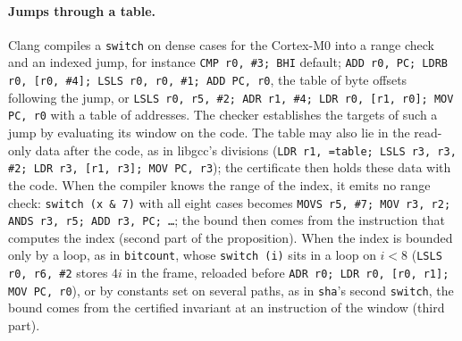 \documentclass[oneside,english]{amsart}
\numberwithin{equation}{section}
\theoremstyle{plain}
\theoremstyle{definition}
\theoremstyle{plain}
\theoremstyle{plain}
\theoremstyle{remark}
\begin{document}
\paragraph{Jumps through a table.} Clang compiles a \texttt{switch} on dense cases for the Cortex-M0 into a range check and an indexed jump, for instance \texttt{CMP r0, \#3; BHI} default; \texttt{ADD r0, PC; LDRB r0, [r0, \#4]; LSLS r0, r0, \#1; ADD PC, r0}, the table of byte offsets following the jump, or \texttt{LSLS r0, r5, \#2; ADR r1, \#4; LDR r0, [r1, r0]; MOV PC, r0} with a table of addresses. The checker establishes the targets of such a jump by evaluating its window on the code. The table may also lie in the read-only data after the code, as in libgcc's divisions (\texttt{LDR r1, =table; LSLS r3, r3, \#2; LDR r3, [r1, r3]; MOV PC, r3}); the certificate then holds these data with the code. When the compiler knows the range of the index, it emits no range check: \texttt{switch (x \& 7)} with all eight cases becomes \texttt{MOVS r5, \#7; MOV r3, r2; ANDS r3, r5; ADD r3, PC; \dots}; the bound then comes from the instruction that computes the index (second part of the proposition). When the index is bounded only by a loop, as in \texttt{bitcount}, whose \texttt{switch (i)} sits in a loop on $i < 8$ (\texttt{LSLS r0, r6, \#2} stores $4i$ in the frame, reloaded before \texttt{ADR r0; LDR r0, [r0, r1]; MOV PC, r0}), or by constants set on several paths, as in \texttt{sha}'s second \texttt{switch}, the bound comes from the certified invariant at an instruction of the window (third part).
\end{document}
